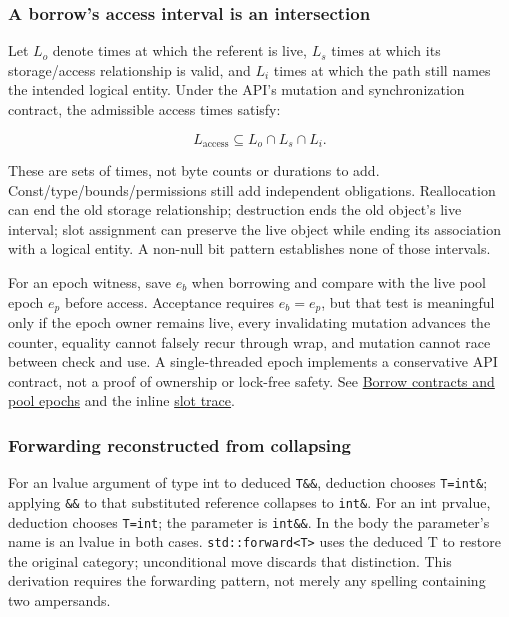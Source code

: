 \subsubsection{A borrow's access interval is an intersection}\label{a-borrows-access-interval-is-an-intersection}

Let \(L_o\) denote times at which the referent is live, \(L_s\) times at which its storage/access relationship is valid, and \(L_i\) times at which the path still names the intended logical entity. Under the API's mutation and synchronization contract, the admissible access times satisfy:

\[
L_{\mathrm{access}}\subseteq L_o\cap L_s\cap L_i.
\]

These are sets of times, not byte counts or durations to add. Const/type/bounds/permissions still add independent obligations. Reallocation can end the old storage relationship; destruction ends the old object's live interval; slot assignment can preserve the live object while ending its association with a logical entity. A non-null bit pattern establishes none of those intervals.

For an epoch witness, save \(e_b\) when borrowing and compare with the live pool epoch \(e_p\) before access. Acceptance requires \(e_b=e_p\), but that test is meaningful only if the epoch owner remains live, every invalidating mutation advances the counter, equality cannot falsely recur through wrap, and mutation cannot race between check and use. A single-threaded epoch implements a conservative API contract, not a proof of ownership or lock-free safety. See \hyperref[appendix-aa405b7c3903]{Borrow contracts and pool epochs} and the inline \hyperref[01-foundations-i-ch003]{slot trace}.

\subsubsection{Forwarding reconstructed from collapsing}\label{forwarding-reconstructed-from-collapsing}

For an lvalue argument of type int to deduced \texttt{T\&\&}, deduction chooses \texttt{T=int\&}; applying \texttt{\&\&} to that substituted reference collapses to \texttt{int\&}. For an int prvalue, deduction chooses \texttt{T=int}; the parameter is \texttt{int\&\&}. In the body the parameter's name is an lvalue in both cases. \texttt{std::forward\textless{}T\textgreater{}} uses the deduced T to restore the original category; unconditional move discards that distinction. This derivation requires the forwarding pattern, not merely any spelling containing two ampersands.


